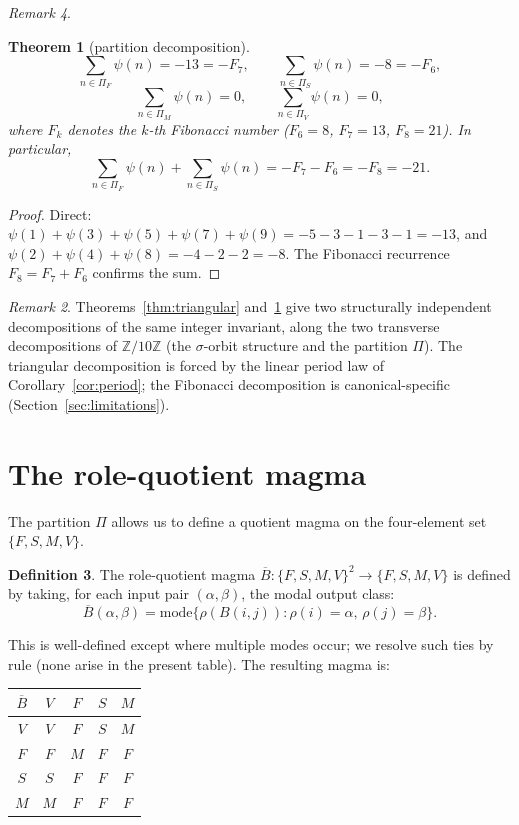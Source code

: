 \documentclass[submission,copyright,creativecommons]{eptcs}
\theoremstyle{plain}
\newtheorem{theorem}{Theorem}
\theoremstyle{definition}
\newtheorem{definition}[theorem]{Definition}
\theoremstyle{remark}
\newtheorem{remark}[theorem]{Remark}
\begin{document}
\begin{remark}
\begin{theorem}[partition decomposition]\label{thm:fibonacci}
\[
\sum_{n \in \Pi_F} \psi(n) = -13 = -F_7,
\qquad
\sum_{n \in \Pi_S} \psi(n) = -8 = -F_6,
\]
\[
\sum_{n \in \Pi_M} \psi(n) = 0,
\qquad
\sum_{n \in \Pi_V} \psi(n) = 0,
\]
where $F_k$ denotes the $k$-th Fibonacci number ($F_6 = 8$, $F_7 = 13$,
$F_8 = 21$). In particular,
\[
\sum_{n \in \Pi_F} \psi(n) + \sum_{n \in \Pi_S} \psi(n) = -F_7 - F_6 = -F_8 = -21.
\]
\end{theorem}

\begin{proof}
Direct: $\psi(1) + \psi(3) + \psi(5) + \psi(7) + \psi(9) =
-5 - 3 - 1 - 3 - 1 = -13$, and $\psi(2) + \psi(4) + \psi(8) =
-4 - 2 - 2 = -8$. The Fibonacci recurrence $F_8 = F_7 + F_6$ confirms the
sum.
\end{proof}

\begin{remark}
Theorems~\ref{thm:triangular} and~\ref{thm:fibonacci} give two structurally
independent decompositions of the same integer invariant, along the two
transverse decompositions of $\mathbb{Z}/10\mathbb{Z}$ (the $\sigma$-orbit
structure and the partition $\Pi$). The triangular decomposition is forced
by the linear period law of Corollary~\ref{cor:period}; the Fibonacci
decomposition is canonical-specific (Section~\ref{sec:limitations}).
\end{remark}

\section{The role-quotient magma}\label{sec:role}

The partition $\Pi$ allows us to define a quotient magma on the four-element
set $\{F, S, M, V\}$.

\begin{definition}\label{def:role-magma}
The role-quotient magma $\overline{B} : \{F, S, M, V\}^2 \to \{F, S, M, V\}$
is defined by taking, for each input pair $(\alpha, \beta)$, the modal
output class:
\[
\overline{B}(\alpha, \beta) = \mathrm{mode}\bigl\{ \rho(B(i, j)) : \rho(i) = \alpha,\, \rho(j) = \beta \bigr\}.
\]
\end{definition}

This is well-defined except where multiple modes occur; we resolve such
ties by rule (none arise in the present table). The resulting magma is:

\begin{center}
\begin{tabular}{c|cccc}
$\overline{B}$ & $V$ & $F$ & $S$ & $M$ \\
\hline
$V$ & $V$ & $F$ & $S$ & $M$ \\
$F$ & $F$ & $M$ & $F$ & $F$ \\
$S$ & $S$ & $F$ & $F$ & $F$ \\
$M$ & $M$ & $F$ & $F$ & $F$ \\
\end{tabular}
\end{center}


\end{remark}
\end{document}
